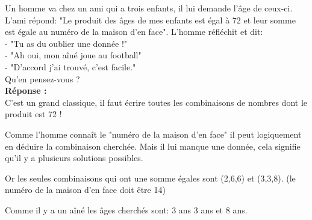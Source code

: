 Un homme va chez un ami qui a trois enfants, il lui demande l'âge de ceux-ci. L'ami répond: "Le produit des âges de mes enfants est égal à 72 et leur somme est égale au numéro de la maison d'en face". L'homme réfléchit et dit:\\

- "Tu as du oublier une donnée !"\\
- "Ah oui, mon aîné joue au football"\\
- "D'accord j'ai trouvé, c'est facile."\\

Qu'en pensez-vous ?\\

\textbf{Réponse :}\\

C'est un grand classique, il faut écrire toutes les combinaisons de nombres 
dont le produit est 72 !

Comme l'homme connaît le "numéro de la maison d'en face" il peut logiquement 
en déduire la combinaison cherchée. Mais il lui manque une donnée, cela 
signifie qu'il y a plusieurs solutions possibles.

Or les seules combinaisons qui ont une somme égales sont (2,6,6) et (3,3,8). 
(le numéro de la maison d'en face doit être 14)

Comme il y a un aîné les âges cherchés sont: 3 ans 3 ans et 8 ans.
